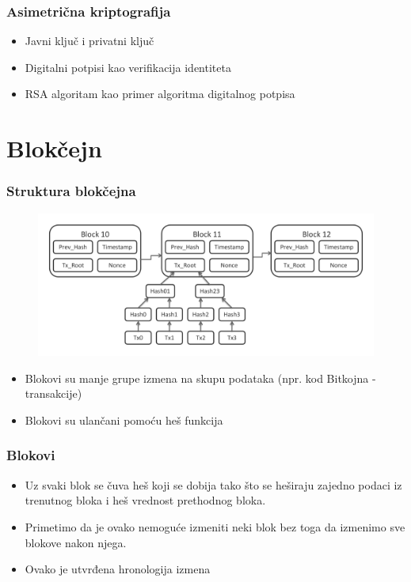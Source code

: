 \documentclass{beamer}
\begin{document}
\begin{frame}[fragile]\frametitle{Asimetrična kriptografija}
	\begin{itemize}
            \item Javni ključ i privatni ključ
            \item Digitalni potpisi kao verifikacija identiteta
            \item RSA algoritam kao primer algoritma digitalnog potpisa
        \end{itemize}
\end{frame}


\section{Blokčejn}

\begin{frame}[fragile]\frametitle{Struktura blokčejna}
	\begin{figure}[H]
		\includegraphics[scale=0.25]{bitcoin_blockchain_diagram.pdf}
	\end{figure}
	\begin{itemize}
		\item Blokovi su manje grupe izmena na skupu podataka (npr. kod Bitkojna - transakcije)
		\item Blokovi su ulančani pomoću heš funkcija
	\end{itemize}
\end{frame}

\begin{frame}[fragile]\frametitle{Blokovi}
	\begin{itemize}
		\item Uz svaki blok se čuva heš koji se dobija tako što se heširaju zajedno podaci iz trenutnog bloka i heš vrednost prethodnog bloka.
		\item Primetimo da je ovako nemoguće izmeniti neki blok bez toga da izmenimo sve blokove nakon njega.
		\item Ovako je utvrđena hronologija izmena
	\end{itemize}
\end{frame}
\end{document}
